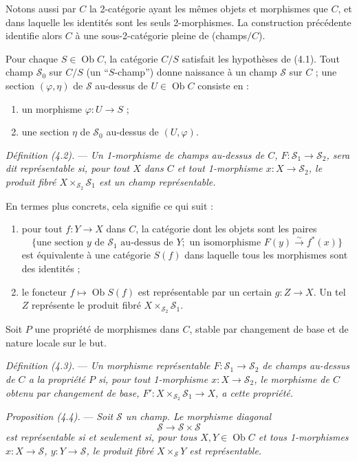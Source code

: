 \documentclass[10pt]{article}
\begin{document}
Notons aussi par $C$ la 2-catégorie ayant les mêmes objets et morphismes que $C$, et dans laquelle les identités sont les seuls 2-morphismes. La construction précédente identifie alors $C$ à une sous-2-catégorie pleine de (champs$/C$).

Pour chaque $S\in\operatorname{Ob} C$, la catégorie $C/S$ satisfait les hypothèses de (4.1). Tout champ $\mathscr S_0$ sur $C/S$ (un ``$S$-champ'') donne naissance à un champ $\mathscr S$ sur $C$ ; une section $(\varphi,\eta)$ de $\mathscr S$ au-dessus de $U\in\operatorname{Ob} C$ consiste en :
\begin{enumerate}[label=(\roman*)]
\item un morphisme $\varphi:U\to S$ ;
\item une section $\eta$ de $\mathscr S_0$ au-dessus de $(U,\varphi)$.
\end{enumerate}

\medskip
\noindent\emph{Définition (4.2).} --- \emph{Un 1-morphisme de champs au-dessus de $C$, $F:\mathscr S_1\to\mathscr S_2$, sera dit représentable si, pour tout $X$ dans $C$ et tout 1-morphisme $x:X\to\mathscr S_2$, le produit fibré $X\times_{\mathscr S_2}\mathscr S_1$ est un champ représentable.}

En termes plus concrets, cela signifie ce qui suit :
\begin{enumerate}[label=(\roman*)]
\item pour tout $f:Y\to X$ dans $C$, la catégorie dont les objets sont les paires
\[
\{\text{une section }y\text{ de }\mathscr S_1\text{ au-dessus de }Y;\text{ un isomorphisme }F(y)\xrightarrow{\sim}f^*(x)\}
\]
est équivalente à une catégorie $S(f)$ dans laquelle tous les morphismes sont des identités ;
\item le foncteur $f\mapsto\operatorname{Ob} S(f)$ est représentable par un certain $g:Z\to X$. Un tel $Z$ représente le produit fibré $X\times_{\mathscr S_2}\mathscr S_1$.
\end{enumerate}

Soit $P$ une propriété de morphismes dans $C$, stable par changement de base et de nature locale sur le but.

\medskip
\noindent\emph{Définition (4.3).} --- \emph{Un morphisme représentable $F:\mathscr S_1\to\mathscr S_2$ de champs au-dessus de $C$ a la propriété $P$ si, pour tout 1-morphisme $x:X\to\mathscr S_2$, le morphisme de $C$ obtenu par changement de base, $F':X\times_{\mathscr S_2}\mathscr S_1\to X$, a cette propriété.}

\medskip
\noindent\emph{Proposition (4.4).} --- \emph{Soit $\mathscr S$ un champ. Le morphisme diagonal}
\[
\mathscr S\to\mathscr S\times\mathscr S
\]
\emph{est représentable si et seulement si, pour tous $X,Y\in\operatorname{Ob} C$ et tous 1-morphismes $x:X\to\mathscr S$, $y:Y\to\mathscr S$, le produit fibré $X\times_{\mathscr S}Y$ est représentable.}
\end{document}
